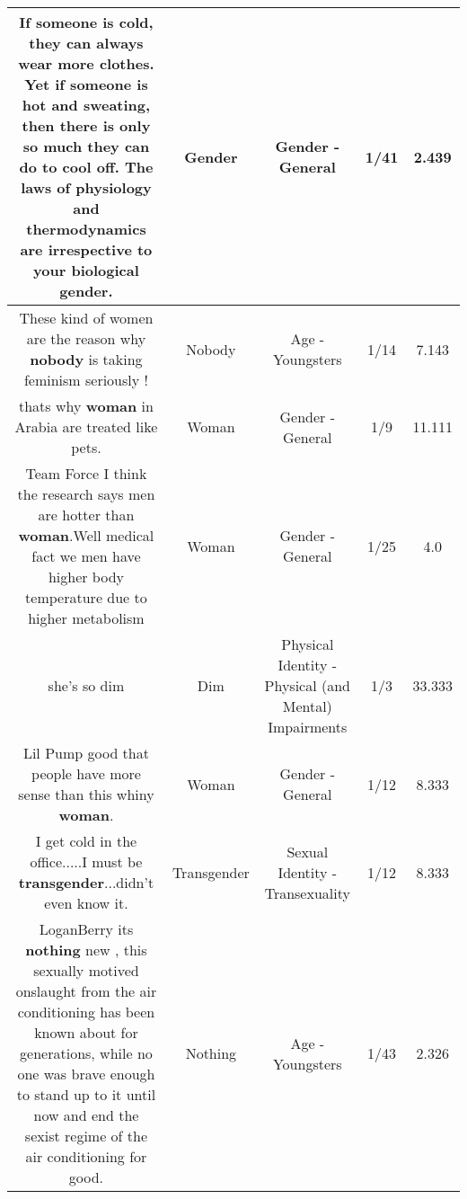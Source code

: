 \documentclass[11pt]{article}
\newlength\mylength
\begin{document}
\begin{center}
\begin{longtable}{|C{.65\mylength}|C{.30\mylength}|C{.12\mylength}|C{.12\mylength}|C{.12\mylength}|}
  \small If someone is cold, they can always wear more clothes. Yet if someone is hot and sweating, then there is only so much they can do to cool off. The laws of physiology and thermodynamics are irrespective to your biological \textbf{gender}.\normalsize   & Gender & Gender - General & 1/41 & 2.439 \\  \hline
  \small These kind of women are the reason why \textbf{nobody} is taking feminism seriously !\normalsize   & Nobody & Age - Youngsters & 1/14 & 7.143 \\  \hline
  \small thats why \textbf{woman} in Arabia are treated like pets.\normalsize   & Woman & Gender - General & 1/9 & 11.111 \\  \hline
  \small Team Force I think the research says men are hotter than \textbf{woman}.Well medical fact we men have higher body temperature due to higher metabolism\normalsize   & Woman & Gender - General & 1/25 & 4.0 \\  \hline
  \small she's so dim\normalsize   & Dim & Physical Identity - Physical (and Mental) Impairments & 1/3 & 33.333 \\  \hline
  \small Lil Pump good that people have more sense than this whiny \textbf{woman}.\normalsize   & Woman & Gender - General & 1/12 & 8.333 \\  \hline
  \small I get cold in the office.....I must be \textbf{transgender}...didn't even know it.\normalsize   & Transgender & Sexual Identity - Transexuality & 1/12 & 8.333 \\  \hline
  \small LoganBerry its \textbf{nothing} new , this sexually motived onslaught from the air conditioning has been known about for generations, while no one was brave enough to stand up to it until now and end the sexist regime of the air conditioning for good.\normalsize   & Nothing & Age - Youngsters & 1/43 & 2.326 \\  \hline

\end{longtable}
\end{center}
\end{document}
